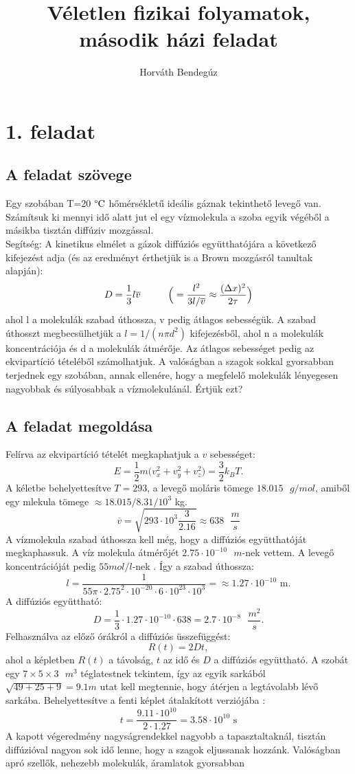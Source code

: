 \documentclass[12pt]{article}
\title{Véletlen fizikai folyamatok, második házi feladat}
\author{Horváth Bendegúz}
\begin{document}
\maketitle
\section*{1. feladat}
\subsection*{A feladat szövege}
Egy szobában T=20$\text{ \textdegree{C}}$ hőmérsékletű ideális gáznak tekinthető levegő van. Számítsuk
ki mennyi idő alatt jut el egy vízmolekula a szoba egyik végéből a másikba tisztán diffúziv mozgással.\\
Segítség:
A kinetikus elmélet a gázok diffúziós együtthatójára a következő kifejezést adja (és az eredményt érthetjük is a Brown mozgásról tanultak alapján):
$$ D = \frac{1}{3}l\overline{v}\hspace{1 cm}\Big (= \frac{l^2}{3l/\overline{v}}\approx\frac{(\Delta x)^2}{2\tau}\Big )$$
     ahol l a molekulák szabad úthossza, v pedig átlagos sebességük. A szabad úthosszt megbecsülhetjük a $l = 1/(n\pi d^2)$ kifejezésből, ahol n a molekulák koncentrációja és d a molekulák átmérője. Az átlagos sebességet pedig az ekvipartíció tételéből számolhatjuk.
A valóságban a szagok sokkal gyorsabban terjednek egy szobában, annak ellenére, hogy a megfelelő molekulák lényegesen nagyobbak és súlyosabbak a vízmolekulánál. Értjük ezt?


\subsection*{A feladat megoldása}
Felírva az ekvipartíció tételét megkaphatjuk a $v$ sebességet:
$$E = \frac{1}{2}m\big (v^2_x+v^2_y+v^2_z \big ) = \frac{3}{2}k_B T.$$
A kéletbe behelyettesítve $T = 293$, a levegő moláris tömege $18.015 \text{ }g/mol$, amiből egy mlekula tömege $\approx 18.015/8.31/10^3$ kg.
 $$\overline{v} = \sqrt{293\cdot 10^3 \frac{3}{2.16 }} \approx 638 \text{  }\frac{m}{s} $$
A vízmolekula szabad úthossza kell még, hogy a diffúziós együtthatóját megkaphassuk. A víz molekula átmérőjét $2.75\cdot10^{-10}\text{ }m$-nek vettem\cite{diam}. A levegő koncentrációját pedig $55 mol/l$-nek \cite{conc}.
Így a szabad úthossza:
$$l = \frac{1}{55 \pi\cdot 2.75^2\cdot 10^{-20}\cdot 6\cdot 10^{23}\cdot 10^3} = \approx 1.27 \cdot 10^{-10} \text{ m.}$$
A diffúziós együttható:
$$D = \frac{1}{3}\cdot 1.27\cdot 10^{-10}\cdot 638 = 2.7\cdot 10^{-8} \text{  }\frac{m^2}{s} .$$
Felhasználva az előző órákról a diffúziós üsszefüggést:
$$R(t) = 2Dt,$$
ahol a képletben $R(t)$ a távolság, $t$ az idő és $D$ a diffúziós együttható. A szobát egy $7 \times 5\times 3 \text{  }m^3$ téglatestnek tekintem, így az egyik sarkából $\sqrt{49+25+9} = 9.1 m$ utat kell megtennie, hogy átérjen a legtávolabb lévő sarkába. Behelyettesítve a fenti képlet átalakított verziójába :
$$t =  \frac{9.11\cdot 10^{10}}{2\cdot 1.27} = 3.58\cdot 10^{10}\text{ s}$$
A kapott végeredmény nagyságrendekkel nagyobb a tapasztaltaknál, tisztán diffúzióval nagyon sok idő lenne, hogy a szagok eljussanak hozzánk. Valóságban apró szellők, nehezebb molekulák, áramlatok gyorsabban 
\newpage
\end{document}
